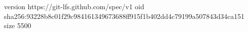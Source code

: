 version https://git-lfs.github.com/spec/v1
oid sha256:93228b8c01f29c984161349673688ff915f1b402dd4c79199a507843d34ca151
size 5500
